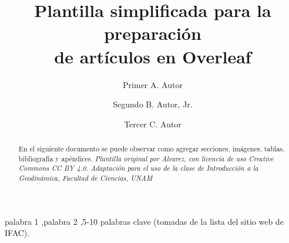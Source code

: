 \documentclass[5p,times,authoryear]{elsarticle}
\begin{document}
\begin{frontmatter}






\title{Plantilla simplificada para la preparación \\
de artículos en Overleaf}

\author[First]{Primer A. Autor} %

\author[Second]{Segundo B. Autor, Jr.}

\author[Third]{Tercer C. Autor}


\address[First,Second,Third]{Facultad de Ciencias, Universidad Nacional Autónoma de México, Ciudad Universitaria, c.p. 04510, Ciudad de México}


\begin{abstract}
En el siguiente documento se puede observar como agregar secciones, imágenes, tablas, bibliografía y apéndices. \emph{Plantilla original por Alvarez, con licencia de uso Creative Commons CC BY 4.0. Adaptación para el uso de la clase de Introducción a la Geodinámica, Facultad de Ciencias, UNAM}
\end{abstract}

\begin{keyword}

palabra 1 \sep palabra 2 \sep 5-10 palabras clave (tomadas de la lista del sitio web de IFAC).

\end{keyword}

\end{frontmatter}
\end{document}
